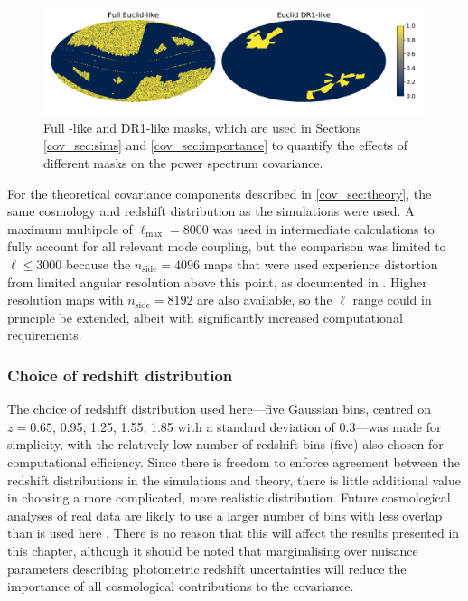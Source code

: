 \begin{figure}
\includegraphics[width=\textwidth]{masks}
\caption{Full \Euclid{}-like and \Euclid{} DR1-like masks, which are used in Sections \ref{cov_sec:sims} and \ref{cov_sec:importance} to quantify the effects of different masks on the power spectrum covariance.}
\label{cov_fig:masks}
\end{figure}

For the theoretical covariance components described in \autoref{cov_sec:theory}, the same cosmology and redshift distribution as the simulations were used. A maximum multipole of $\ell_\text{max} = 8000$ was used in intermediate calculations to fully account for all relevant mode coupling, but the comparison was limited to $\ell \leq 3000$ because the $n_\text{side} = 4096$ maps that were used experience distortion from limited angular resolution above this point, as documented in \citet{Takahashi2017}. Higher resolution maps with $n_\text{side} = 8192$ are also available, so the $\ell$ range could in principle be extended, albeit with significantly increased computational requirements.

\subsubsection{Choice of redshift distribution}
\label{cov_sec:redshift}

The choice of redshift distribution used here---five Gaussian bins, centred on $z = 0.65$, 0.95, 1.25, 1.55, 1.85 with a standard deviation of 0.3---was made for simplicity,  with the relatively low number of redshift bins (five) also chosen for computational efficiency. Since there is freedom to enforce agreement between the redshift distributions in the simulations and theory, there is little additional value in choosing a more complicated, more realistic distribution. Future cosmological analyses of real \Euclid{} data are likely to use a larger number of bins with less overlap than is used here \citep[e.g.][]{Pocino2021}. There is no reason that this will affect the results presented in this chapter, although it should be noted that marginalising over nuisance parameters describing photometric redshift uncertainties will reduce the importance of all cosmological contributions to the covariance.


